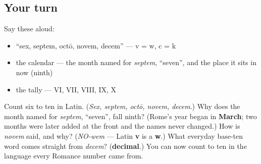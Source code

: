 \subsection*{Your turn}
Say these aloud:

\begin{itemize}
\raggedright
  \item \textquotedblleft{}sex, septem, octō, novem, decem\textquotedblright{} — v = w, c = k
  \item the calendar — the month named for \emph{septem}, \textquotedblleft{}seven\textquotedblright{}, and the place it sits in now (ninth)
  \item the tally — VI, VII, VIII, IX, X
\end{itemize}

\begin{tcolorbox}[breakable,colback=teal!4,colframe=teal!35!black,title={Before you move on}]
Count six to ten in Latin. (\emph{Sex, septem, octō, novem, decem}.) Why does the month named for \emph{septem}, \textquotedblleft{}seven\textquotedblright{}, fall ninth? (Rome's year began in \textbf{March}; two months were later added at the front and the names never changed.) How is \emph{novem} said, and why? (\emph{NO-wem} — Latin \textbf{v} is a \textbf{w}.) What everyday base-ten word comes straight from \emph{decem}? (\textbf{decimal}.) You can now count to ten in the language every Romance number came from.
\end{tcolorbox}
